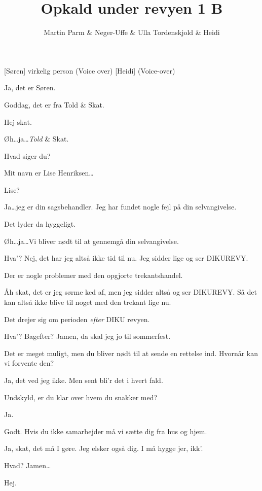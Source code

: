 \documentclass[a4paper]{article}
\title{Opkald under revyen 1 B}
\author{Martin Parm \& Neger-Uffe \& Ulla Tordenskjold \& Heidi}
\begin{document}
\maketitle

\begin{roles}
[Søren] virkelig person (Voice over)
[Heidi] (Voice-over)
\end{roles}

\begin{sketch}

 Ja, det er Søren.

 Goddag, det er fra Told \& Skat.

 Hej skat.

 Øh\ldots ja\ldots \emph{Told} \& Skat.

 Hvad siger du?

 Mit navn er Lise Henriksen\ldots

 Lise? 

 Ja\ldots jeg er din sagsbehandler. Jeg har fundet nogle fejl på din
selvangivelse.

 Det lyder da hyggeligt.

 Øh\ldots ja\ldots Vi bliver nødt til at gennemgå din selvangivelse.

 Hva'? Nej, det har jeg altså ikke tid til nu. Jeg sidder lige og ser
DIKUREVY.

 Der er nogle problemer med den opgjorte trekantshandel.

 Åh skat, det er jeg sørme ked af, men jeg sidder altså og ser
DIKUREVY. Så det kan altså ikke blive til noget med den trekant lige nu.

 Det drejer sig om perioden \emph{efter} DIKU revyen.

 Hva'? Bagefter? Jamen, da skal jeg jo til sommerfest.

 Det er meget muligt, men du bliver nødt til at sende en rettelse ind.
Hvornår kan vi forvente den?

 Ja, det ved jeg ikke. Men sent bli'r det i hvert fald.

 Undskyld, er du klar over hvem du snakker med?

 Ja.

 Godt. Hvis du ikke samarbejder må vi sætte dig fra hus og hjem.

 Ja, skat, det må I gøre. Jeg elsker også dig. I må hygge jer,
ikk'.

 Hvad? Jamen\ldots

 Hej.

\end{sketch}
\end{document}
